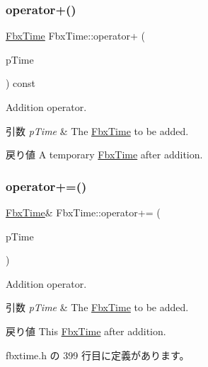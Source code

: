 \subsubsection{\texorpdfstring{operator+()}{operator+()}}
{\footnotesize\ttfamily \hyperlink{class_fbx_time}{Fbx\+Time} Fbx\+Time\+::operator+ (\begin{DoxyParamCaption}\item[{const \hyperlink{class_fbx_time}{Fbx\+Time} \&}]{p\+Time }\end{DoxyParamCaption}) const}

Addition operator. 
\begin{DoxyParams}{引数}
{\em p\+Time} & The \hyperlink{class_fbx_time}{Fbx\+Time} to be added. \\
\hline
\end{DoxyParams}
\begin{DoxyReturn}{戻り値}
A temporary \hyperlink{class_fbx_time}{Fbx\+Time} after addition. 
\end{DoxyReturn}
\mbox{\label{class_fbx_time_ac65f799bcf861bc3ace76e7feabd6043}} 
\subsubsection{\texorpdfstring{operator+=()}{operator+=()}}
{\footnotesize\ttfamily \hyperlink{class_fbx_time}{Fbx\+Time}\& Fbx\+Time\+::operator+= (\begin{DoxyParamCaption}\item[{const \hyperlink{class_fbx_time}{Fbx\+Time} \&}]{p\+Time }\end{DoxyParamCaption})\hspace{0.3cm}{\ttfamily [inline]}}

Addition operator. 
\begin{DoxyParams}{引数}
{\em p\+Time} & The \hyperlink{class_fbx_time}{Fbx\+Time} to be added. \\
\hline
\end{DoxyParams}
\begin{DoxyReturn}{戻り値}
This \hyperlink{class_fbx_time}{Fbx\+Time} after addition. 
\end{DoxyReturn}


 fbxtime.\+h の 399 行目に定義があります。

\mbox{\label{class_fbx_time_aea722074dbc93c423fa5b83420f87611}} 
